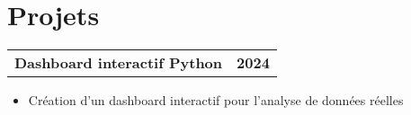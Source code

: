 \documentclass[11pt]{article}
\begin{document}
\section*{Projets}
\noindent
\begin{tabular*}{\textwidth}{@{\extracolsep{\fill}} l r}
\textbf{Dashboard interactif Python} & \textbf{2024} \\
\end{tabular*}
\begin{itemize}[leftmargin=*,itemsep=1pt,topsep=0pt,parsep=0pt,label=\textcolor{orange}{$\rightarrow$}]
    \item Création d’un dashboard interactif pour l’analyse de données réelles
\end{itemize}
\end{document}
